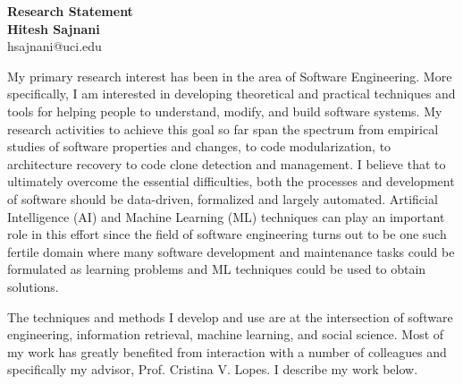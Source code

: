 \documentclass[a4paper]{article}
\begin{document}

\begin{center}
{\LARGE \textbf{Research Statement}} \\[.3in]
{\large  \textbf{Hitesh Sajnani}} \\
{\small hsajnani@uci.edu}
\end{center}
\pagestyle{fancy}
\lhead{\textcolor{black}{\it Hitesh Sajnani}}
\rhead{\textcolor{black}{\thepage/\pageref{LastPage}}}

\vspace*{.5in}

My primary research interest has been in the area of Software Engineering. More specifically, I am interested in developing theoretical and practical techniques and tools for helping people to understand, modify, and build software systems. My research activities to achieve this goal so far span the spectrum from empirical studies of software properties and changes, to code modularization, to architecture recovery to code clone detection and management. 
I believe that  to ultimately overcome the essential difficulties, both the processes and development of software should be data-driven, formalized and largely automated. Artificial Intelligence (AI) and Machine Learning (ML) techniques can play an important role in this effort since the field of software engineering turns out to be one such fertile domain where many software development and maintenance tasks could be formulated as learning problems and ML techniques could be used to obtain solutions.

The techniques and methods I develop and use are at the intersection of software engineering, information retrieval, machine learning, and social science.
Most of my work has greatly benefited from interaction with a number of colleagues and specifically my advisor, Prof. Cristina V. Lopes. I describe my work below.


\end{document}

